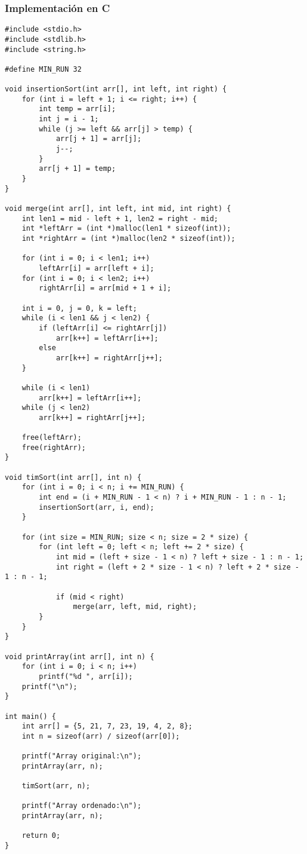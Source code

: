 \documentclass[11pt,openany]{book}
\begin{document}
\subsubsection{Implementación en C}
\lstset{language=C}
\begin{lstlisting}
#include <stdio.h>
#include <stdlib.h>
#include <string.h>

#define MIN_RUN 32

void insertionSort(int arr[], int left, int right) {
    for (int i = left + 1; i <= right; i++) {
        int temp = arr[i];
        int j = i - 1;
        while (j >= left && arr[j] > temp) {
            arr[j + 1] = arr[j];
            j--;
        }
        arr[j + 1] = temp;
    }
}

void merge(int arr[], int left, int mid, int right) {
    int len1 = mid - left + 1, len2 = right - mid;
    int *leftArr = (int *)malloc(len1 * sizeof(int));
    int *rightArr = (int *)malloc(len2 * sizeof(int));

    for (int i = 0; i < len1; i++)
        leftArr[i] = arr[left + i];
    for (int i = 0; i < len2; i++)
        rightArr[i] = arr[mid + 1 + i];

    int i = 0, j = 0, k = left;
    while (i < len1 && j < len2) {
        if (leftArr[i] <= rightArr[j])
            arr[k++] = leftArr[i++];
        else
            arr[k++] = rightArr[j++];
    }

    while (i < len1)
        arr[k++] = leftArr[i++];
    while (j < len2)
        arr[k++] = rightArr[j++];

    free(leftArr);
    free(rightArr);
}

void timSort(int arr[], int n) {
    for (int i = 0; i < n; i += MIN_RUN) {
        int end = (i + MIN_RUN - 1 < n) ? i + MIN_RUN - 1 : n - 1;
        insertionSort(arr, i, end);
    }

    for (int size = MIN_RUN; size < n; size = 2 * size) {
        for (int left = 0; left < n; left += 2 * size) {
            int mid = (left + size - 1 < n) ? left + size - 1 : n - 1;
            int right = (left + 2 * size - 1 < n) ? left + 2 * size - 1 : n - 1;

            if (mid < right)
                merge(arr, left, mid, right);
        }
    }
}

void printArray(int arr[], int n) {
    for (int i = 0; i < n; i++)
        printf("%d ", arr[i]);
    printf("\n");
}

int main() {
    int arr[] = {5, 21, 7, 23, 19, 4, 2, 8};
    int n = sizeof(arr) / sizeof(arr[0]);

    printf("Array original:\n");
    printArray(arr, n);

    timSort(arr, n);

    printf("Array ordenado:\n");
    printArray(arr, n);

    return 0;
}
\end{lstlisting}
\end{document}
